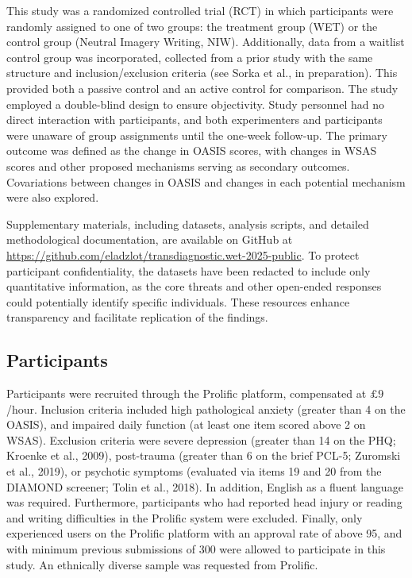 \documentclass[
  man,floatsintext]{apa7}
\begin{document}
This study was a randomized controlled trial (RCT) in which participants were randomly assigned to one of two groups: the treatment group (WET) or the control group (Neutral Imagery Writing, NIW).
Additionally, data from a waitlist control group was incorporated, collected from a prior study with the same structure and inclusion/exclusion criteria (see Sorka et al., in preparation).
This provided both a passive control and an active control for comparison.
The study employed a double-blind design to ensure objectivity.
Study personnel had no direct interaction with participants, and both experimenters and participants were unaware of group assignments until the one-week follow-up.
The primary outcome was defined as the change in OASIS scores, with changes in WSAS scores and other proposed mechanisms serving as secondary outcomes.
Covariations between changes in OASIS and changes in each potential mechanism were also explored.

Supplementary materials, including datasets, analysis scripts, and detailed methodological documentation, are available on GitHub at \url{https://github.com/eladzlot/transdiagnostic.wet-2025-public}.
To protect participant confidentiality, the datasets have been redacted to include only quantitative information, as the core threats and other open-ended responses could potentially identify specific individuals.
These resources enhance transparency and facilitate replication of the findings.

\subsection{Participants}\label{participants}

Participants were recruited through the Prolific platform, compensated at \(\pounds 9\)/hour.
Inclusion criteria included high pathological anxiety (greater than 4 on the OASIS),
and impaired daily function (at least one item scored above 2 on WSAS).
Exclusion criteria were severe depression (greater than 14 on the PHQ; Kroenke et al., 2009), post-trauma (greater than 6 on the brief PCL-5; Zuromski et al., 2019), or psychotic symptoms (evaluated via items 19 and 20 from the DIAMOND screener; Tolin et al., 2018).
In addition, English as a fluent language was required.
Furthermore, participants who had reported head injury or reading and writing difficulties in the Prolific system were excluded.
Finally, only experienced users on the Prolific platform with an approval rate of above 95, and with minimum previous submissions of 300 were allowed to participate in this study.
An ethnically diverse sample was requested from Prolific.
\end{document}

